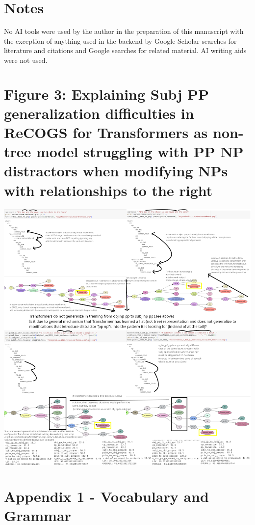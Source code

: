 \documentclass[11pt]{article}
\begin{document}


\section{Notes}
No AI tools were used by the author in the preparation of this manuscript with the exception of anything used in the backend by Google Scholar searches for literature and citations and Google searches for related material. AI writing aids were not used.

\clearpage
\section{Figure 3: Explaining Subj PP generalization difficulties in ReCOGS for Transformers as non-tree model struggling with PP NP distractors when modifying NPs with relationships to the right}
\includegraphics[scale=0.25]{possible_issue_with_subj_pp_generalization_by_transformers_could_be_simple_nontree_pp_np_distractor_when_modifying_nps_with_related_nps_to_right.png}

\clearpage
\section{Appendix 1 - Vocabulary and Grammar}
\end{document}

